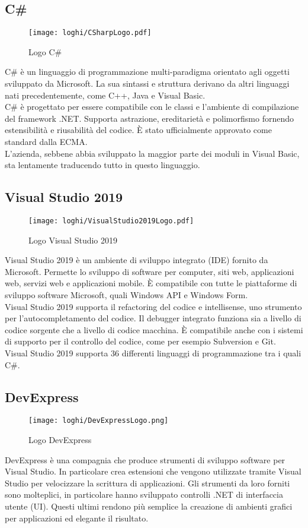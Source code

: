 \subsection*{C\#}
\begin{figure}[!h] 
    \centering 
    \texttt{[image: loghi/CSharpLogo.pdf]} 
    \caption{Logo C\#}
 \end{figure}
\noindent C\# è un linguaggio di programmazione multi-paradigma orientato agli oggetti
sviluppato da Microsoft. La sua sintassi e struttura derivano da altri linguaggi nati
precedentemente, come C++, Java e Visual Basic.\\
C\# è progettato per essere compatibile con le classi e l’ambiente di compilazione
del framework .NET. Supporta astrazione, ereditarietà e polimorfismo
fornendo estensibilità e riusabilità del codice.
È stato ufficialmente approvato come standard dalla ECMA.\\
L'azienda, sebbene abbia sviluppato la maggior parte dei moduli
in Visual Basic, sta lentamente traducendo tutto in questo linguaggio.

\subsection*{Visual Studio 2019}
\begin{figure}[!h] 
    \centering 
    \texttt{[image: loghi/VisualStudio2019Logo.pdf]} 
    \caption{Logo Visual Studio 2019}
 \end{figure}
\noindent Visual Studio 2019 è un ambiente di sviluppo integrato (IDE) fornito da Microsoft.
Permette lo sviluppo di software per computer, siti web, applicazioni web, servizi web
e applicazioni mobile. È compatibile con tutte le piattaforme di sviluppo
software Microsoft, quali Windows API e Windows Form.\\
Visual Studio 2019 supporta il refactoring del codice e intellisense, uno strumento per
l’autocompletamento del codice. Il debugger integrato funziona sia a
livello di codice sorgente che a livello di codice macchina. È compatibile anche con i sistemi di supporto per il controllo del codice,
come per esempio Subversion e Git.\\
Visual Studio 2019 supporta 36 differenti linguaggi di 
programmazione tra i quali C\#.

\subsection*{DevExpress}
\begin{figure}[!h] 
    \centering 
    \texttt{[image: loghi/DevExpressLogo.png]}
    \caption{Logo DevExpress}
\end{figure}
\noindent DevExpress è una compagnia che produce strumenti di sviluppo software per
Visual Studio. In particolare crea estensioni che vengono utilizzate tramite Visual
Studio per velocizzare la scrittura di applicazioni. Gli strumenti da loro forniti sono
molteplici, in particolare hanno sviluppato controlli .NET di interfaccia utente (UI).
Questi ultimi rendono più semplice la creazione di ambienti grafici per applicazioni ed
elegante il risultato.

